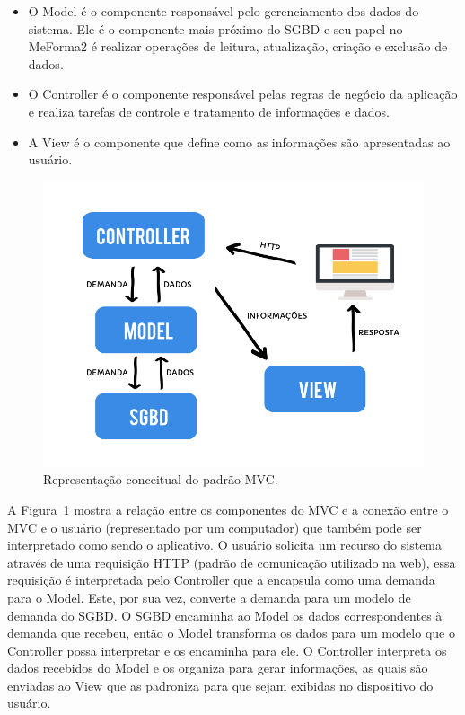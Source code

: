 \begin{itemize}
    \item O Model é o componente responsável pelo gerenciamento dos dados do sistema. Ele é o componente mais próximo do SGBD e seu papel no MeForma2 é realizar operações de leitura, atualização, criação e exclusão de dados.
    \item O Controller é o componente responsável pelas regras de negócio da aplicação e realiza tarefas de controle e tratamento de informações e dados.
    \item A View é o componente que define como as informações são apresentadas ao usuário.
\end{itemize}
\begin{figure}[H]
	   \centering
	   		\includegraphics[scale=0.50]{pics/c3/12-mvc.png}
	   \caption{Representação conceitual do padrão MVC.}
	   \label{mvc}
\end{figure}
A Figura~\ref{mvc} mostra a relação entre os componentes do MVC e a conexão entre o MVC e o usuário (representado por um computador) que também pode ser interpretado como sendo o aplicativo. O usuário solicita um recurso do sistema através de uma requisição HTTP (padrão de comunicação utilizado na web), essa requisição é interpretada pelo Controller que a encapsula como uma demanda para o Model. Este, por sua vez, converte a demanda para um modelo de demanda do SGBD. O SGBD encaminha ao Model os dados correspondentes à demanda que recebeu, então o Model transforma os dados para um modelo que o Controller possa interpretar e os encaminha para ele. O Controller interpreta os dados recebidos do Model e os organiza para gerar informações, as quais são enviadas ao View que as padroniza para que sejam exibidas no dispositivo do usuário.

